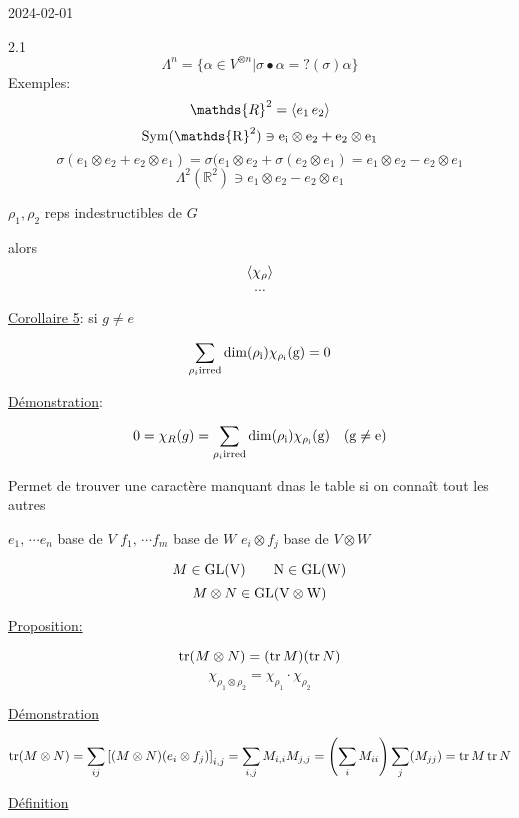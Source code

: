 


2024-02-01

\begin{tcolorbox}[title=typo devoir 1]
	2.1 \[ \Lambda^{n} = \{  \alpha \in V^{\otimes n} | \sigma \bullet \alpha  = ?(\sigma) \alpha\}  \] 
Exemples: \[ 	\mathds{R}^{2} = \expval{e_1 \, e_2 } \]
\[ \rm{Sym}(\mathds{R}^{2}) \ni  e_i \otimes e_2 + e_2 \otimes e_1\]
\[ \sigma(e_1 \otimes e_2 + e_2 \otimes e_1) = \sigma(e_1 \otimes e_{2} + \sigma (e_2 \otimes e_1 ) = e_1 \otimes e_2 - e_2 \otimes e_1 \]
\[ \Lambda^{2}(\mathds{R}^{2}) \ni e_1 \otimes e_2 - e_2 \otimes e_1  \]
\end{tcolorbox}


\begin{tcolorbox}[title=Rappels]
	 $\rho_1 , \rho_2 $ reps indestructibles de $G$

	 alors \[  \expval{\chi_{\rho} } \]
	 \[ \dotsb \]
\end{tcolorbox}


\underline{Corollaire 5}: 
si $g \neq e$

\[ \sum_{\rho_i \text{irred} } \rm{dim} (\rho_i )\chi_{\rho_i}(g) = 0  \]

\underline{Démonstration}: 

\[ 0 = \chi_R (g) = \sum_{\rho_i \text{irred} } \rm{dim} (\rho_i )\chi_{\rho_i}(g)\quad (g \neq e) \]

Permet de trouver une caractère manquant dnas le table si on connaît tout les autres

\begin{tcolorbox}[title=Plus d'algèbre linéaire ]
	$e_1 ,\, \dotsb e_n$ base de $V$  $f_1 ,\, \dotsb f_m$ base de $W$ 
	$e_i \otimes f_j $ base de $V \otimes W$

	\[ M \in \rm{GL}(V) \qquad N \in \rm{GL}(W)  \]
	\[ M \otimes N \in \rm{GL}(V \otimes W) \]

\end{tcolorbox}

\underline{Proposition:}

\[ \tr(M \otimes N) = (\tr M)(\tr N) \]
\[ \chi_{\rho_1 \otimes \rho_2 } = \chi_{\rho_1} \cdot \chi_{\rho_2}  \]

\underline{Démonstration} 
 
\[ \tr(M \otimes N) = \sum_{ij} \left[ (M \otimes N) (e_i \otimes f_j ) \right]_{i,j } = \sum_{i,j} M_{i,i} M_{j,j} = \left( \sum_i M_{ii}  \right) \sum_j (M_{jj} )  = \tr M \tr N \]

\underline{Définition} 

